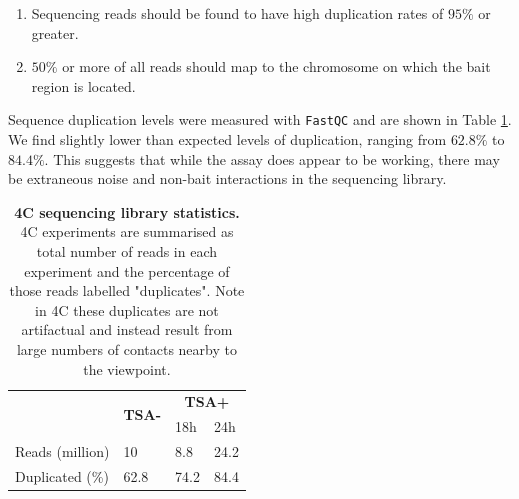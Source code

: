 \documentclass[a4paper,11pt,oneside]{book}
\begin{document}
\begin{enumerate}
\item Sequencing reads should be found to have high duplication rates of $95\%$ or greater.
\item $50\%$ or more of all reads should map to the chromosome on which the bait region is located.
\end{enumerate}


Sequence duplication levels were measured with \texttt{FastQC}\cite{fastqc} and are shown in Table \ref{tab:4c}. We find slightly lower than expected levels of duplication, ranging from $62.8\%$ to $84.4\%$. This suggests that while the assay does appear to be working, there may be extraneous noise and non-bait interactions in the sequencing library.

\begin{table}[]
\centering
\caption[4C sequencing library statistics.]{ {\bf 4C sequencing library statistics.}
4C experiments are summarised as total number of reads in each experiment and the percentage of those reads labelled "duplicates". Note in 4C these duplicates are not artifactual and instead result from large numbers of contacts nearby to the viewpoint.
}
\label{tab:4c}
\begin{tabular}{l|l|ll|}
\cline{2-4}
                                      & \multicolumn{1}{c|}{\multirow{2}{*}{{\bf TSA-}}} & \multicolumn{2}{c|}{{\bf TSA+}} \\
                                      & \multicolumn{1}{c|}{}                            & 18h            & 24h            \\ \hline
\multicolumn{1}{|l|}{Reads (million)} & 10                                               & 8.8            & 24.2           \\
\multicolumn{1}{|l|}{Duplicated (\%)} & 62.8                                             & 74.2           & 84.4           \\ \hline
\end{tabular}
\end{table}
\end{document}
